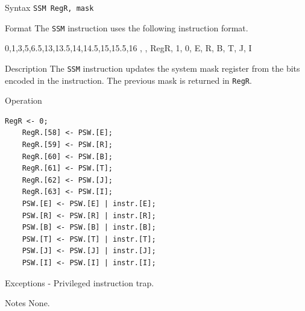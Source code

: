 %
%
\pagebreak
{}

\begin{iPageDescEntry}{Syntax}
    \texttt{SSM RegR, mask}
\end{iPageDescEntry}

\begin{iPageDescEntry}{Format}
    The \texttt{SSM} instruction uses the following instruction format. \\
    
    \begin{flushleft}
    \drawInstrFormat
        {0,1,3,5,6.5,13,13.5,14,14.5,15,15.5,16}
        {\OpCodeGrpSYS, \OpCodeSSM, RegR, 1, 0, E, R, B, T, J, I}
    \end{flushleft}

\end{iPageDescEntry}

\begin{iPageDescEntry}{Description}
    The \texttt{SSM} instruction updates the system mask 
    register from the bits encoded in the instruction. The previous mask is returned in \texttt{RegR}.  
\end{iPageDescEntry}

\begin{iPageDescOpEntry}{Operation}
	\begin{lstlisting}[style=iPageOpStyle]
	RegR <- 0;
	RegR.[58] <- PSW.[E];
	RegR.[59] <- PSW.[R];
	RegR.[60] <- PSW.[B];
	RegR.[61] <- PSW.[T];
	RegR.[62] <- PSW.[J];
	RegR.[63] <- PSW.[I];
	PSW.[E] <- PSW.[E] | instr.[E];
	PSW.[R] <- PSW.[R] | instr.[R];
	PSW.[B] <- PSW.[B] | instr.[B];
	PSW.[T] <- PSW.[T] | instr.[T];
	PSW.[J] <- PSW.[J] | instr.[J];
	PSW.[I] <- PSW.[I] | instr.[I];
	\end{lstlisting}
\end{iPageDescOpEntry}

\begin{iPageDescEntry}{Exceptions}
    - Privileged instruction trap.
\end{iPageDescEntry}

\begin{iPageDescEntry}{Notes}
    None.
\end{iPageDescEntry}

